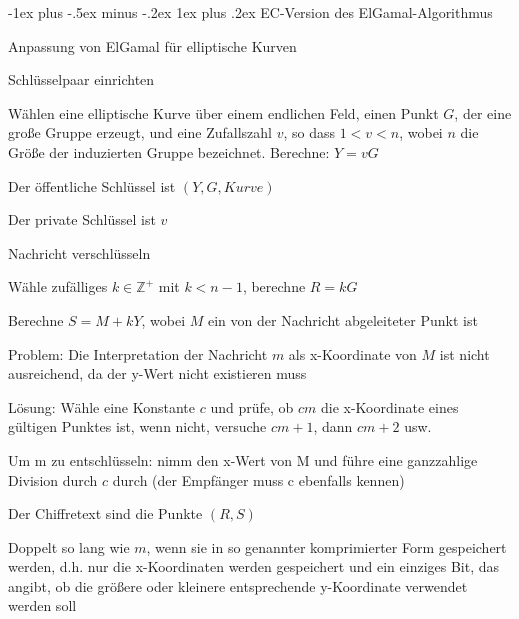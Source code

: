 \documentclass[a4paper]{article}
\makeatletter
\renewcommand{\subsubsection}{\@startsection{subsubsection}{3}{0mm}%
 {-1ex plus -.5ex minus -.2ex}%
 {1ex plus .2ex}%
 {\normalfont\small\bfseries}}
\makeatother
\begin{document}
\begin{multicols}{3}
      \subsubsection{EC-Version des ElGamal-Algorithmus}
      \begin{itemize*}
            \item Anpassung von ElGamal für elliptische Kurven%
            \item Schlüsselpaar einrichten
            \begin{itemize*}
                  \item Wählen eine elliptische Kurve über einem endlichen Feld, einen Punkt $G$, der eine große Gruppe erzeugt, und eine Zufallszahl $v$, so dass $1 < v < n$, wobei $n$ die Größe der induzierten Gruppe bezeichnet. Berechne: $Y = vG$
                  \item Der öffentliche Schlüssel ist $(Y,G,Kurve)$
                  \item Der private Schlüssel ist $v$
            \end{itemize*}
            \item Nachricht verschlüsseln
            \begin{itemize*}
                  \item Wähle zufälliges $k\in\mathbb{Z}^+$ mit $k<n-1$, berechne $R=kG$
                  \item Berechne $S=M+kY$, wobei $M$ ein von der Nachricht abgeleiteter Punkt ist
                  \item Problem: Die Interpretation der Nachricht $m$ als x-Koordinate von $M$ ist nicht ausreichend, da der y-Wert nicht existieren muss
                  \item Lösung: Wähle eine Konstante $c$ und prüfe, ob $cm$ die x-Koordinate eines gültigen Punktes ist, wenn nicht, versuche $cm+1$, dann $cm+2$ usw.
                  \item Um m zu entschlüsseln: nimm den x-Wert von M und führe eine ganzzahlige Division durch $c$ durch (der Empfänger muss c ebenfalls kennen)
                  \item Der Chiffretext sind die Punkte $(R,S)$
                  \item Doppelt so lang wie $m$, wenn sie in so genannter komprimierter Form gespeichert werden, d.h. nur die x-Koordinaten werden gespeichert und ein einziges Bit, das angibt, ob die größere oder kleinere entsprechende y-Koordinate verwendet werden soll
            \end{itemize*}

\end{itemize*}
\end{multicols}
\end{document}
